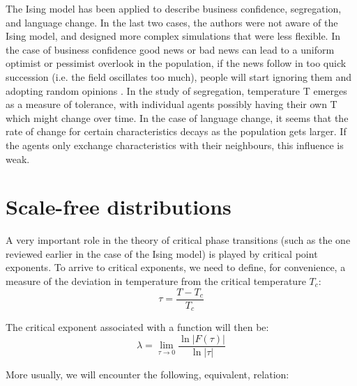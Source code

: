 \documentclass[12pt,openright,twoside]{book}
\begin{document}
The Ising model has been applied to describe business confidence, segregation, and language change\cite{stauffer_2008}. In the last two cases\cite{schelling_1971,nettle_1999}, the authors were not aware of the Ising model, and designed more complex simulations that were less flexible. In the case of business confidence\cite{hohnisch_pittnauer_solomon_stauffer_2005} good news or bad news can lead to a uniform optimist or pessimist overlook in the population, if the news follow in too quick succession (i.e. the field oscillates too much), people will start ignoring them and adopting random opinions \cite{hohnisch_stauffer_pittnauer_2008}. In the study of segregation, temperature T emerges as a measure of tolerance, with individual agents possibly having their own T which might change over time. In the case of language change, it seems that the rate of change for certain characteristics decays as the population gets larger. If the agents only exchange characteristics with their neighbours, this influence is weak.\\

\section{Scale-free distributions}

A very important role in the theory of critical phase transitions (such as the one reviewed earlier in the case of the Ising model) is played by critical point exponents\cite{yeomans_1992}. To arrive to critical exponents, we need to define, for convenience, a measure of the deviation in temperature from the critical temperature $T_c$:\\

\begin{equation}
\tau=\frac{T-T_c}{T_c}
\label{deviation-critical}
\end{equation}

\vspace{14pt}

The critical exponent associated with a function will then be:\\

\begin{equation}
\lambda=\lim_{\tau\to 0}\frac{\ln|F(\tau)|}{\ln|\tau|}
\label{critical-exponent}
\end{equation}

\vspace{14pt}

More usually, we will encounter the following, equivalent, relation:\\
\end{document}
